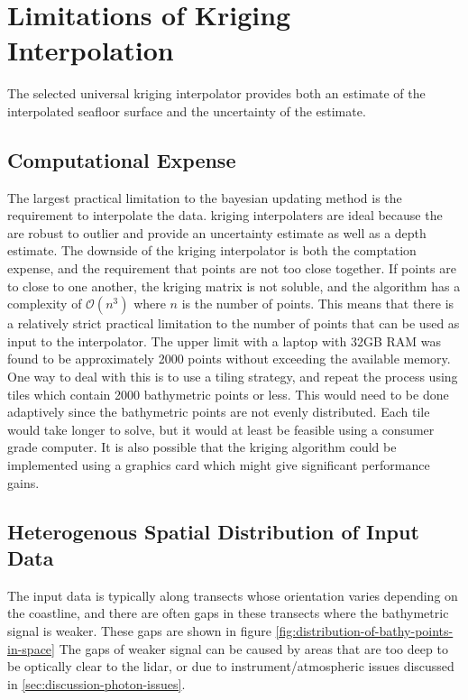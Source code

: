 \section{Limitations of Kriging Interpolation}

The selected universal kriging interpolator provides both an estimate of the interpolated seafloor surface and the uncertainty of the estimate.

\subsection{Computational Expense}

The largest practical limitation to the bayesian updating method is the requirement to interpolate the data. kriging interpolaters are ideal because the are robust to outlier and provide an uncertainty estimate as well as a depth estimate. The downside of the kriging interpolator is both the comptation expense, and the requirement that points are not too close together. If points are to close to one another, the kriging matrix is not soluble, and the algorithm has a complexity of $\mathcal{O}(n^3)$ where $n$ is the number of points. This means that there is a relatively strict practical limitation to the number of points that can be used as input to the interpolator. The upper limit with a laptop with 32GB RAM was found to be approximately 2000 points without exceeding the available memory. One way to deal with this is to use a tiling strategy, and repeat the process using tiles which contain 2000 bathymetric points or less. This would need to be done adaptively since the bathymetric points are not evenly distributed. Each tile would take longer to solve, but it would at least be feasible using a consumer grade computer. It is also possible that the kriging algorithm could be implemented using a graphics card which might give significant performance gains.

\subsection{Heterogenous Spatial Distribution of Input Data}

The input data is typically along transects whose orientation varies depending on the coastline, and there are often gaps in these transects where the bathymetric signal is weaker. These gaps are shown in figure \ref{fig:distribution-of-bathy-points-in-space} The gaps of weaker signal can be caused by areas that are too deep to be optically clear to the lidar, or due to instrument/atmospheric issues discussed in \ref{sec:discussion-photon-issues}. 

